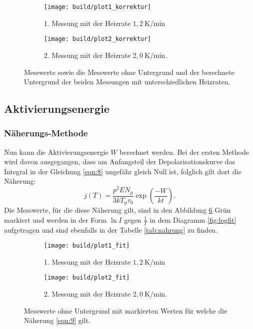 \begin{figure}
  \centering
  \begin{subfigure}{0.49\textwidth}
    \centering
    \texttt{[image: build/plot1\_korrektur]}
    \caption{1. Messung mit der Heizrate $1,2 \ \si{\kelvin\per\minute}$}
    \label{fig:korr1}
  \end{subfigure}
  \begin{subfigure}{0.49\textwidth}
    \centering
    \texttt{[image: build/plot2\_korrektur]}
    \caption{2. Messung mit der Heizrate $2,0 \ \si{\kelvin\per\minute}$.}
    \label{fig:korr2}
  \end{subfigure}
\caption{Messwerte sowie die Messwerte ohne Untergrund  und der berechnete Untergrund der beiden Messungen mit unterschiedlichen Heizraten.}
\label{fig:korr}
\end{figure}


\subsection{Aktivierungsenergie}
\label{sec:Aktivierungsenergie}
\subsubsection{Näherungs-Methode}
\label{sec:naherung}
Nun kann die Aktivierungsenergie $W$ berechnet werden.
Bei der ersten Methode wird davon ausgegangen, dass am Anfangsteil
der Depolarisationskurve das Integral in der Gleichung \eqref{eqn:8}
ungefähr gleich Null ist, folglich gilt dort die Näherung:
\begin{equation}
j(T)=\frac{p^2EN_\mathrm{p}}{3kT_\mathrm{p}\tau_{0}}\exp\left(\frac{-W}{kt}\right). \label{eqn:9}
\end{equation}
Die Messwerte, für die diese Näherung gilt, sind
in den Abbildung \ref{fig:fit} Grün markiert
und werden in der Form
$\ln I$ gegen $\frac{1}{T}$ in dem Diagramm
\ref{fig:logfit} aufgetragen und sind ebenfalls in der Tabelle \ref{tab:nahrung} zu finden.




\begin{figure}
  \centering
  \begin{subfigure}{0.49\textwidth}
    \centering
    \texttt{[image: build/plot1\_fit]}
    \caption{1. Messung mit der Heizrate $1,2 \ \si{\kelvin\per\minute}$}
    \label{fig:fit1}
  \end{subfigure}
  \begin{subfigure}{0.49\textwidth}
    \centering
    \texttt{[image: build/plot2\_fit]}
    \caption{2. Messung mit der Heizrate $2,0 \ \si{\kelvin\per\minute}$.}
    \label{fig:fit2}
  \end{subfigure}
\caption{Messwerte ohne Untergrund mit markierten Werten für welche
die Näherung \ref{eqn:9} gilt.}
\label{fig:fit}
\end{figure}





